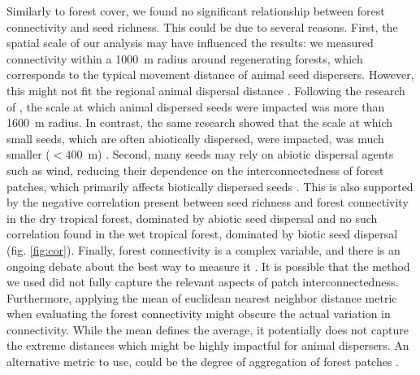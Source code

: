 Similarly to forest cover, we found no significant relationship between forest connectivity and seed richness. This could be due to several reasons. First, the spatial scale of our analysis may have influenced the results: we measured connectivity within a 1000~m radius around regenerating forests, which corresponds to the typical movement distance of animal seed dispersers. However, this might not fit the regional animal dispersal distance \citep{corlettSeedDispersalDistances2009}. Following the research of \cite{v.h.safarLandscapeOpennessHas2022a}, the scale at which animal dispersed seeds were impacted was more than 1600~m radius. In contrast, the same research showed that the scale at which small seeds, which are often abiotically dispersed, were impacted, was much smaller ($<400$~m) \citep{v.h.safarLandscapeOpennessHas2022a}. Second, many seeds may rely on abiotic dispersal agents such as wind, reducing their dependence on the interconnectedness of forest patches, which primarily affects biotically dispersed seeds \citep{dentUnitingNicheDifferentiation2021}. %
This is also supported by the negative correlation present between seed richness and forest connectivity in the dry tropical forest, dominated by abiotic seed dispersal and no such correlation found in the wet tropical forest, dominated by biotic seed dispersal (fig. \ref{fig:cor}). 
Finally, forest connectivity is a complex variable, and there is an ongoing debate about the best way to measure it \citep{tischendorf2000should}. It is possible that the method we used did not fully capture the relevant aspects of patch interconnectedness. Furthermore, applying the mean of euclidean nearest neighbor distance metric when evaluating the forest connectivity might obscure the actual variation in connectivity. While the mean defines the average, it potentially does not capture the extreme distances which might be highly impactful for animal dispersers. An alternative metric to use, could be the degree of aggregation of forest patches \citep{he2000aggregation, mcgarigal2002fragstats}.  



